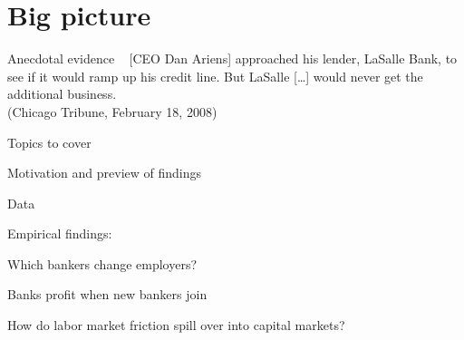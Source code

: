 \documentclass[notes,11pt, aspectratio=169]{beamer}
\newenvironment{wideitemize}{\itemize\addtolength{\itemsep}{10pt}  \setlength\itemsep{.5em}}{\enditemize}
\begin{document}
\section{Big picture}
\begin{frame}{Anecdotal evidence}
\centering
  \faQuoteLeft~ [CEO Dan Ariens] approached his lender, LaSalle Bank, to see if it would ramp up his credit line. But LaSalle [\ldots] would never get the additional business. \\ \vspace{.5cm} 
  \hfill  (Chicago Tribune, February 18, 2008) 

 
\end{frame}

\begin{frame}{Topics to cover}
  \begin{wideitemize}
    \item Motivation and preview of findings 
    \item Data
    \item Empirical findings:
    \begin{wideitemize} 
      \item Which bankers change employers?
      \item Banks profit when new bankers join 
      \item How do labor market friction spill over into capital markets? 
    \end{wideitemize}
  \end{wideitemize}
\end{frame}
\end{document}
